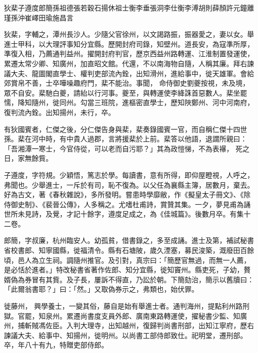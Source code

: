 
\begin{pinyinscope}

 狄棐子遵度郎簡孫祖德張若穀石揚休祖士衡李垂張洞李仕衡李溥胡則薛顏許元鐘離瑾孫沖崔嶧田瑜施昌言



 狄棐，字輔之，潭州長沙人。少隨父官徐州，以文謁路振，振器愛之，妻以女。舉進士甲科，以大理評事知分宜縣。歷開封府司錄，知壁州。道長安，為寇準所厚，準復入相，乃薦通判益州。擢開封府判官，歷京西益州路轉運、江淮制置發運使，累遷太常少卿、知廣州，加直昭文館。代還，不以南海物自隨，人稱其廉。拜右諫議大夫、龍圖閣直學士、權判吏部流內銓，出知滑州，進給事中，徙天雄軍。會給郊賞帛不善，士卒嘩噪趣府門，棐不能治。事聞，
 命侍御史劉夔按視，未及境，眾不自安。棐馳白夔，請紿以行河事。夔至，與轉運使李絳誅首惡數人。棐坐罷懦，降知隨州，徙同州。勾當三班院，進樞密直學士，歷知陜鄭州、河中河南府，復判流內銓。出知揚州，未行，卒。



 有狄國賓者，仁傑之後，分仁傑告身與棐，棐奏錄國賓一官，而自稱仁傑十四世孫。棐在河中時，有中貴人過郡，言將援棐於上前。棐答以他語，退謂所親曰：「吾湘潭一寒士，今官侍從，可以老而自污耶？」其為政愷悌，不為表襮，
 死之日，家無餘貲。



 子遵度，字符規。少穎悟，篤志於學。每讀書，意有所得，即仰屋瞪視，人呼之，弗聞也。少舉進士，一斥於有司，恥不復為。以父任為襄縣主簿，居數月，棄去。好為古文，著《春秋雜說》，多所發明。嘗患時學靡敝，作《擬皇太子冊文》、《除侍御史制》、《裴晉公傳》，人多稱之。尤嗜杜甫詩，賞贊其集。一夕，夢見甫為誦世所未見詩，及覺，才記十餘字，遵度足成之，為《佳城篇》。後數月卒。有集十二卷。



 郎簡，字叔廉，杭州臨安人。幼孤貧，借書錄之，多至成誦。進士及第，補試秘書省校書郎、知寧國縣，徙福清令。縣有石塘陂，歲久湮塞，募民浚築，溉廢田百餘頃，邑人為立生祠。調隨州推官。及引對，真宗曰：「簡歷官無過，而無一人薦，是必恬於進者。」特改秘書省著作佐郎、知分宜縣，徙知竇州。縣吏死，子幼，贅婿偽為券冒有其貲。及子長，屢訴不得直，乃訟於朝。下簡劾治，簡示以舊牘曰：「此爾翁書耶？」曰：「然。」又取偽券示之，弗類也，始伏罪。



 徙藤州，
 興學養士，一變其俗，藤自是始有舉進士者。通判海州，提點利州路刑獄。官罷，知泉州。累遷尚書度支員外郎、廣南東路轉運使，擢秘書少監、知廣州，捕斬賊馮佐臣。入判大理寺，出知越州，復歸判尚書刑部，出知江寧府，歷右諫議大夫、給事中、知揚州，徙明州。以尚書工部侍郎致仕。祀明堂，遷刑部。卒，年八十有九，特贈吏部侍郎。




\end{pinyinscope}
